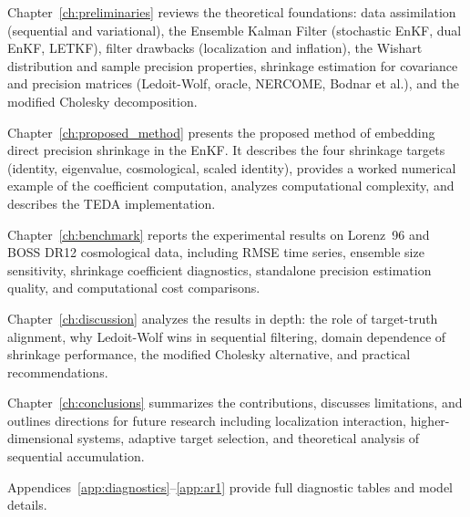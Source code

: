 Chapter~\ref{ch:preliminaries} reviews the theoretical foundations: data assimilation (sequential and variational), the Ensemble Kalman Filter (stochastic EnKF, dual EnKF, LETKF), filter drawbacks (localization and inflation), the Wishart distribution and sample precision properties, shrinkage estimation for covariance and precision matrices (Ledoit-Wolf, oracle, NERCOME, Bodnar et al.), and the modified Cholesky decomposition.

Chapter~\ref{ch:proposed_method} presents the proposed method of embedding direct precision shrinkage in the EnKF. It describes the four shrinkage targets (identity, eigenvalue, cosmological, scaled identity), provides a worked numerical example of the coefficient computation, analyzes computational complexity, and describes the TEDA implementation.

Chapter~\ref{ch:benchmark} reports the experimental results on Lorenz~96 and BOSS DR12 cosmological data, including RMSE time series, ensemble size sensitivity, shrinkage coefficient diagnostics, standalone precision estimation quality, and computational cost comparisons.

Chapter~\ref{ch:discussion} analyzes the results in depth: the role of target-truth alignment, why Ledoit-Wolf wins in sequential filtering, domain dependence of shrinkage performance, the modified Cholesky alternative, and practical recommendations.

Chapter~\ref{ch:conclusions} summarizes the contributions, discusses limitations, and outlines directions for future research including localization interaction, higher-dimensional systems, adaptive target selection, and theoretical analysis of sequential accumulation.

Appendices~\ref{app:diagnostics}--\ref{app:ar1} provide full diagnostic tables and model details.
